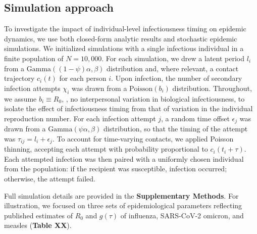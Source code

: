 \subsection{Simulation approach}

To investigate the impact of individual-level infectiousness timing on epidemic dynamics, we use both closed-form analytic results and stochastic epidemic simulations. We initialized simulations with a single infectious individual in a finite population of $N = 10,000$. For each simulation, we drew a latent period $l_i$ from a $\text{Gamma}((1 - \psi)\alpha, \beta)$ distribution and, where relevant, a contact trajectory $c_i(t)$ for each person $i$. Upon infection, the number of secondary infection attempts $\chi_i$ was drawn from a $\text{Poisson}(b_i)$ distribution. Throughout, we assume $b_i \equiv R_0$, \ie, no interpersonal variation in biological infectiousness, to isolate the effect of infectiousness timing from that of variation in the individual reproduction number. For each infection attempt $j$, a random time offset $\epsilon_j$ was drawn from a $\text{Gamma}(\psi \alpha, \beta)$ distribution, so that the timing of the attempt was $\tau_{ij} = l_i + \epsilon_j$. To account for time-varying contacts, we applied Poisson thinning, accepting each attempt with probability proportional to $c_i(t_i + \tau)$. Each attempted infection was then paired with a uniformly chosen individual from the population: if the recipient was susceptible, infection occurred; otherwise, the attempt failed. 

Full simulation details are provided in the {\bf Supplementary Methods}. For illustration, we focused on three sets of epidemiological parameters reflecting published estimates of $R_0$ and $g(\tau)$ of influenza, SARS-CoV-2 omicron, and measles ({\bf Table XX}). 
